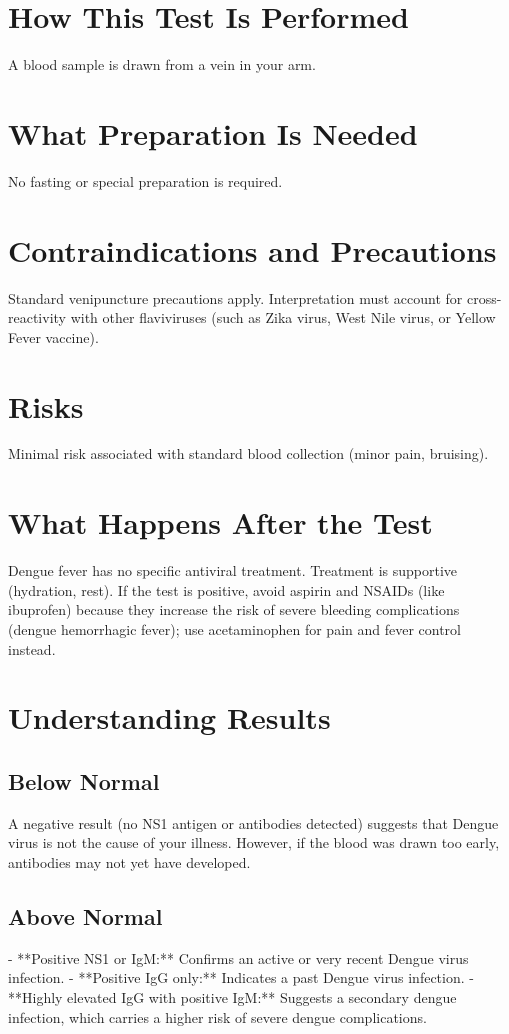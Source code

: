 \section*{How This Test Is Performed}
A blood sample is drawn from a vein in your arm.

\section*{What Preparation Is Needed}
No fasting or special preparation is required.

\section*{Contraindications and Precautions}
Standard venipuncture precautions apply. Interpretation must account for cross-reactivity with other flaviviruses (such as Zika virus, West Nile virus, or Yellow Fever vaccine).

\section*{Risks}
Minimal risk associated with standard blood collection (minor pain, bruising).

\section*{What Happens After the Test}
Dengue fever has no specific antiviral treatment. Treatment is supportive (hydration, rest). If the test is positive, avoid aspirin and NSAIDs (like ibuprofen) because they increase the risk of severe bleeding complications (dengue hemorrhagic fever); use acetaminophen for pain and fever control instead.

\section*{Understanding Results}

\subsection*{Below Normal}
A negative result (no NS1 antigen or antibodies detected) suggests that Dengue virus is not the cause of your illness. However, if the blood was drawn too early, antibodies may not yet have developed.

\subsection*{Above Normal}
- **Positive NS1 or IgM:** Confirms an active or very recent Dengue virus infection.
- **Positive IgG only:** Indicates a past Dengue virus infection.
- **Highly elevated IgG with positive IgM:** Suggests a secondary dengue infection, which carries a higher risk of severe dengue complications.

